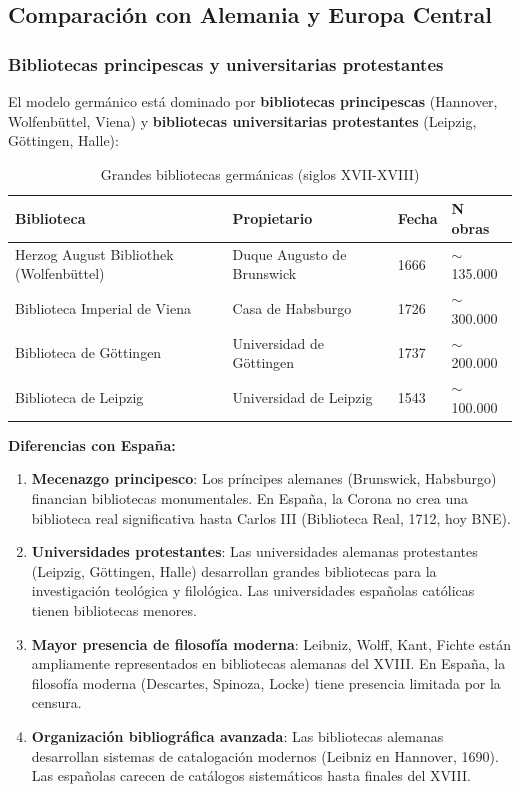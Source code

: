 \documentclass[11pt,a4paper]{article}
\begin{document}
\subsection{Comparación con Alemania y Europa Central}

\subsubsection{Bibliotecas principescas y universitarias protestantes}

El modelo germánico está dominado por \textbf{bibliotecas principescas} (Hannover, Wolfenbüttel, Viena) y \textbf{bibliotecas universitarias protestantes} (Leipzig, Göttingen, Halle):

\begin{table}[h]
\centering
\begin{tabular}{llll}
\toprule
\textbf{Biblioteca} & \textbf{Propietario} & \textbf{Fecha} & \textbf{N obras} \\
\midrule
Herzog August Bibliothek (Wolfenbüttel) & Duque Augusto de Brunswick & 1666 & $\sim$135.000 \\
Biblioteca Imperial de Viena & Casa de Habsburgo & 1726 & $\sim$300.000 \\
Biblioteca de Göttingen & Universidad de Göttingen & 1737 & $\sim$200.000 \\
Biblioteca de Leipzig & Universidad de Leipzig & 1543 & $\sim$100.000 \\
\bottomrule
\end{tabular}
\caption{Grandes bibliotecas germánicas (siglos XVII-XVIII)}
\end{table}

\textbf{Diferencias con España:}

\begin{enumerate}
\item \textbf{Mecenazgo principesco}: Los príncipes alemanes (Brunswick, Habsburgo) financian bibliotecas monumentales. En España, la Corona no crea una biblioteca real significativa hasta Carlos III (Biblioteca Real, 1712, hoy BNE).

\item \textbf{Universidades protestantes}: Las universidades alemanas protestantes (Leipzig, Göttingen, Halle) desarrollan grandes bibliotecas para la investigación teológica y filológica. Las universidades españolas católicas tienen bibliotecas menores.

\item \textbf{Mayor presencia de filosofía moderna}: Leibniz, Wolff, Kant, Fichte están ampliamente representados en bibliotecas alemanas del XVIII. En España, la filosofía moderna (Descartes, Spinoza, Locke) tiene presencia limitada por la censura.

\item \textbf{Organización bibliográfica avanzada}: Las bibliotecas alemanas desarrollan sistemas de catalogación modernos (Leibniz en Hannover, 1690). Las españolas carecen de catálogos sistemáticos hasta finales del XVIII.
\end{enumerate}
\end{document}
